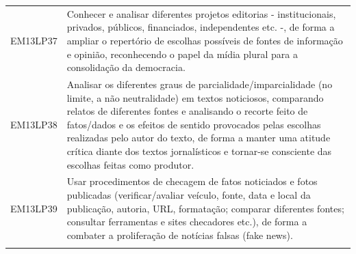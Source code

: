\documentclass[12pt]{extarticle}
\begin{document}
\begin{longtable}{ll}
EM13LP37   & Conhecer e analisar diferentes projetos editorias - institucionais, privados, públicos, financiados, independentes etc. -, de forma a ampliar o repertório de escolhas possíveis de fontes de informação e opinião, reconhecendo o papel da mídia plural para a consolidação da democracia.                                                                                                                                                                                                                                                                                                                                                                                                                                                                                                                           \\
\rowcolor[HTML]{FFF} 
EM13LP38   & Analisar os diferentes graus de parcialidade/imparcialidade (no limite, a não neutralidade) em textos noticiosos, comparando relatos de diferentes fontes e analisando o recorte feito de fatos/dados e os efeitos de sentido provocados pelas escolhas realizadas pelo autor do texto, de forma a manter uma atitude crítica diante dos textos jornalísticos e tornar-se consciente das escolhas feitas como produtor.                                                                                                                                                                                                                                                                                                                                                                                               \\
\rowcolor[HTML]{E0F7FA} 
EM13LP39   & Usar procedimentos de checagem de fatos noticiados e fotos publicadas (verificar/avaliar veículo, fonte, data e local da publicação, autoria, URL, formatação; comparar diferentes fontes; consultar ferramentas e sites checadores etc.), de forma a combater a proliferação de notícias falsas (fake news).                                                                                                                                                                                                                                                                                                                                                                                                                                                                                                         \\
\rowcolor[HTML]{FFF} 

\end{longtable}
\end{document}
